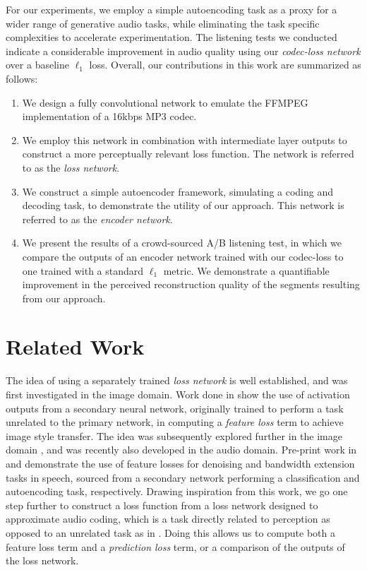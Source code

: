 \documentclass[sigconf]{acmart}
\begin{document}
For our experiments, we employ a simple autoencoding task as a proxy for a wider range of generative audio tasks, while eliminating the task specific complexities to accelerate experimentation. The listening tests we conducted indicate a considerable improvement in audio quality using our \emph{codec-loss network} over a baseline $\ell_{1}$ loss. Overall, our contributions in this work are summarized as follows:

\begin{enumerate}
    \item We design a fully convolutional network to emulate the FFMPEG implementation of a 16kbps MP3 codec.
    \item We employ this network in combination with intermediate layer outputs  to construct a more perceptually relevant loss function.  The network is referred to as the \textit{loss network}.
    \item We construct a simple autoencoder framework, simulating a coding and decoding task, to demonstrate the utility of our approach.  This network is referred to as the \textit{encoder network}.
    \item We present the results of a crowd-sourced A/B listening test, in which we compare the outputs of an encoder network trained with our codec-loss to one trained with a standard $\ell_{1}$ metric.  We demonstrate a quantifiable improvement in the perceived reconstruction quality of the segments resulting from our approach.
\end{enumerate}


\section{Related Work}

The idea of using a separately trained \textit{loss network} is well established, and was first investigated in the image domain.  Work done in \cite{style1, style2} show the use of activation  outputs from a secondary neural network, originally trained to perform a task unrelated to the primary network, in computing a \textit{feature loss} term to achieve image style transfer.  The idea was subsequently explored further in the image domain \cite{deepsim}, and was recently also developed in the audio domain.  Pre-print work in \cite{germain2018speech} and \cite{kim2019adversarial} demonstrate the use of feature losses for denoising and bandwidth extension tasks in speech, sourced from a secondary network performing a classification and autoencoding task, respectively.  Drawing inspiration from this work, we go one step further to construct a loss function from a loss network designed to approximate audio coding, which is a task directly related to perception as opposed to an unrelated task as in \cite{germain2018speech}. Doing this allows us to compute both a feature loss term and a \textit{prediction loss} term, or a comparison of the outputs of the loss network.
\end{document}

